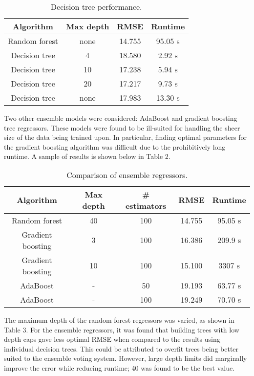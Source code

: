 \documentclass[11pt]{article}
\begin{document}
	\begin{table}[h!]
		\begin{center}
			\caption{Decision tree performance.}
			\begin{tabular}{ c c c c }
				\hline
				Algorithm & Max depth & RMSE & Runtime \\ \hline
				Random forest & none & 14.755 & 95.05 s \\ 
				Decision tree & 4 & 18.580 & 2.92 s \\
				Decision tree & 10 & 17.238 & 5.94 s \\
				Decision tree & 20 & 17.217 & 9.73 s \\
				Decision tree & none & 17.983 & 13.30 s\\
				\hline
			\end{tabular}
		\end{center}
	\end{table}
	
	Two other ensemble models were considered: AdaBoost and gradient
	boosting tree regressors.
	These models were found to be ill-suited
	for handling the sheer size of the data being trained upon. In
	particular, finding optimal parameters for the gradient
	boosting algorithm was difficult due to the prohibitively long
	runtime. A sample of results is shown below in Table 2.
	
	\begin{table}[h!]
		\begin{center}
			\caption{Comparison of ensemble regressors.}
			\begin{tabular}{ c c c c c }
				\hline
				Algorithm & Max depth & \# estimators & RMSE & Runtime \\ \hline
				Random forest & 40 & 100 & 14.755 & 95.05 s \\ 
				Gradient boosting & 3 & 100 & 16.386 & 209.9 s \\
				Gradient boosting & 10 & 100 & 15.100 & 3307 s \\
				AdaBoost & - & 50 & 19.193 & 63.77 s \\
				AdaBoost & - & 100 & 19.249 & 70.70 s \\
				\hline
			\end{tabular}
		\end{center}
	\end{table}
	
	The maximum depth of the random forest regressors was varied, as
	shown in Table 3. For the ensemble regressors, it was found that
	building trees with low depth caps gave less optimal RMSE when
	compared to the results using individual decision trees. This could be
	attributed to overfit trees being better suited to the ensemble
	voting system. However, large depth limits did marginally improve the
	error while reducing runtime; 40 was found to be the best value. \newline
	\pagebreak
	
\end{document}
